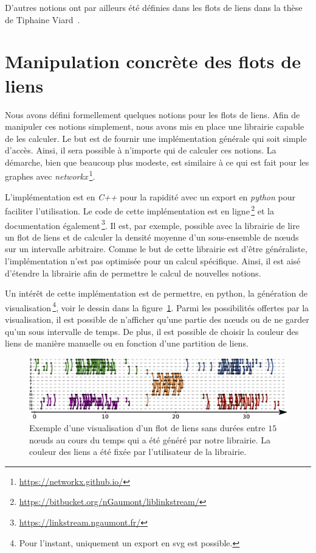\bigskip
D'autres notions ont par ailleurs été définies dans les flots de liens dans la thèse de Tiphaine Viard~\cite{viard2016flots}.

\section{Manipulation concrète des flots de liens}

Nous avons défini formellement quelques notions pour les flots de liens.
Afin de manipuler ces notions simplement, nous avons mis en place une librairie capable de les calculer.
Le but est de fournir une implémentation générale qui soit simple d'accès.
Ainsi, il sera possible à n'importe qui de calculer ces notions.
La démarche, bien que beaucoup plus modeste, est similaire à ce qui est fait pour les graphes avec \emph{networkx}\,\footnote{\url{https://networkx.github.io/}}.

L'implémentation est en \emph{C++} pour la rapidité avec un export en \emph{python} pour faciliter l'utilisation.
Le code de cette implémentation est en ligne\,\footnote{\url{https://bitbucket.org/nGaumont/liblinkstream/}} et la documentation également\,\footnote{\url{https://linkstream.ngaumont.fr/}}.
Il est, par exemple, possible avec la librairie de lire un flot de liens et de calculer la densité moyenne d'un sous-ensemble de n\oe{}uds sur un intervalle arbitraire.
Comme le but de cette librairie est d'être généraliste, l'implémentation n'est pas optimisée pour un calcul spécifique.
Ainsi, il est aisé d'étendre la librairie afin de permettre le calcul de nouvelles notions.
 

Un intérêt de cette implémentation est de permettre, en python, la génération de visualisation\,\footnote{Pour l'instant, uniquement un export en svg est possible.}, voir le dessin dans la figure~\ref{fig:exemple_Flot_de_liens_lib}.
Parmi les possibilités offertes par la visualisation, il est possible de n'afficher qu'une partie des n\oe{}uds ou de ne garder qu'un sous intervalle de temps.
De plus, il est possible de choisir la couleur des liens de manière manuelle ou en fonction d'une partition de liens.

\begin{figure}
\centering
\includegraphics[width=\linewidth]{img/Intro/Dessin_Flot.eps}
\caption{Exemple d'une visualisation d'un flot de liens sans durées entre $15$ n\oe{}uds au cours du temps qui a été généré par notre librairie.
La couleur des liens a été fixée par l'utilisateur de la librairie.
}
\label{fig:exemple_Flot_de_liens_lib}
\end{figure}

